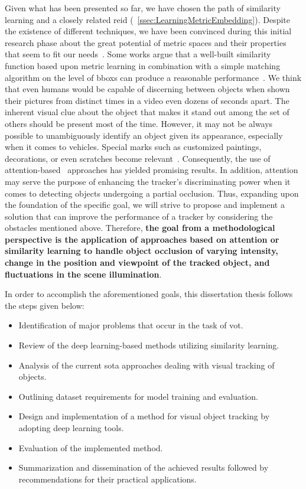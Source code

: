 Given what has been presented so far, we have chosen the path of similarity learning and a closely related \gls{reid} (\sectiontext{}~\ref{ssec:LearningMetricEmbedding}). Despite the existence of different techniques, we have been convinced during this initial research phase about the great potential of metric spaces and their properties that seem to fit our needs~\cite{liu2016ssd}. Some works argue that a well-built similarity function based upon metric learning in combination with a simple matching algorithm on the level of \glspl{bbox} can produce a reasonable performance~\cite{tao2016sint}. We think that even humans would be capable of discerning between objects when shown their pictures from distinct times in a video even dozens of seconds apart. The inherent visual clue about the object that makes it stand out among the set of others should be present most of the time. However, it may not be always possible to unambiguously identify an object given its appearance, especially when it comes to vehicles. Special marks such as customized paintings, decorations, or even scratches become relevant~\cite{liu2016ssd}. Consequently, the use of attention-based~\cite{vaswani2017attention} approaches has yielded promising results. In addition, attention may serve the purpose of enhancing the tracker's discriminating power when it comes to detecting objects undergoing a partial occlusion. Thus, expanding upon the foundation of the specific goal, we will strive to propose and implement a solution that can improve the performance of a tracker by considering the obstacles mentioned above. Therefore, \textbf{the goal from a methodological perspective is the application of approaches based on attention or similarity learning to handle object occlusion of varying intensity, change in the position and viewpoint of the tracked object, and fluctuations in the scene illumination}.

In order to accomplish the aforementioned goals, this dissertation thesis follows the steps given below:
\begin{itemize}
    \item Identification of major problems that occur in the task of \gls{vot}.
    \item Review of the deep learning-based methods utilizing similarity learning.
    \item Analysis of the current \gls{sota} approaches dealing with visual tracking of objects.
    \item Outlining dataset requirements for model training and evaluation.
    \item Design and implementation of a method for visual object tracking by adopting deep learning tools.
    \item Evaluation of the implemented method.
    \item Summarization and dissemination of the achieved results followed by recommendations for their practical applications.
\end{itemize}
